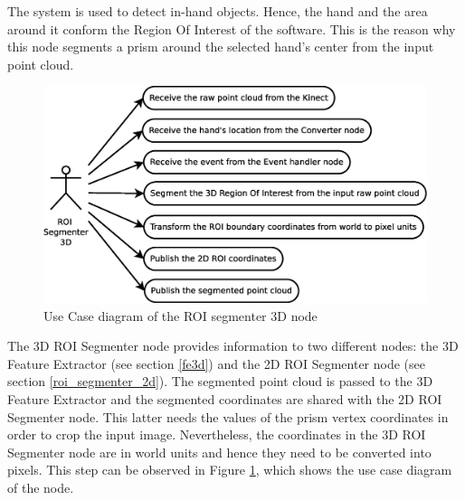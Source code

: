 	The system is used to detect in-hand objects. 
	Hence, the hand and the area around it conform the Region Of Interest of the software. 
	This is the reason why this node segments a prism around the selected hand's center from the input point cloud.
	\\


	
\vspace{0.5cm}


	\begin{figure}[H]
		\centering
	\includegraphics[scale=0.4]{img/diagrams/uc_roi_segmenter_3d.eps}
		\caption[Use case diagram ROI segmenter 3D node]{Use Case diagram of the ROI segmenter 3D node}
		\label{uc_roi3d}	
	\end{figure}
 \vspace{0.5cm}

\newpage
The 3D ROI Segmenter node provides information to two different nodes: the 3D Feature Extractor (see section \ref{fe3d}) and the 2D ROI Segmenter node (see section \ref{roi_segmenter_2d}). 
	The segmented point cloud is passed to the 3D Feature Extractor and the segmented coordinates are shared with the 2D ROI Segmenter node. 
	This latter needs the values of the prism vertex coordinates in order to crop the input image. 
	Nevertheless, the coordinates in the 3D ROI Segmenter node are in world units and hence they need to be converted into pixels. 
	This step can be observed in Figure \ref{uc_roi3d}, which shows the use case diagram of the node. 
\\
	
